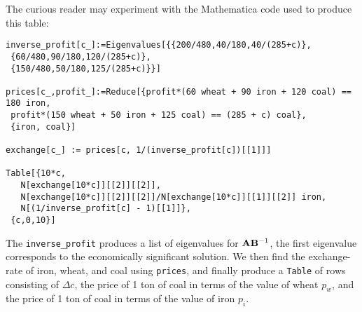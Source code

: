   The curious reader may experiment with the Mathematica code used to
  produce this table:
\begin{Verbatim}
inverse_profit[c_]:=Eigenvalues[{{200/480,40/180,40/(285+c)},
 {60/480,90/180,120/(285+c)},
 {150/480,50/180,125/(285+c)}}]

prices[c_,profit_]:=Reduce[{profit*(60 wheat + 90 iron + 120 coal) == 180 iron,
 profit*(150 wheat + 50 iron + 125 coal) == (285 + c) coal},
 {iron, coal}]

exchange[c_] := prices[c, 1/(inverse_profit[c])[[1]]]

Table[{10*c,
   N[exchange[10*c]][[2]][[2]],
   N[exchange[10*c]][[2]][[2]]/N[exchange[10*c]][[1]][[2]] iron,
   N[(1/inverse_profit[c] - 1)[[1]]},
 {c,0,10}]
\end{Verbatim}
The \verb#inverse_profit# produces a list of eigenvalues for
$\mathbf{A}\mathbf{B}^{-1}$, the first eigenvalue corresponds to the
economically significant solution. We then find the exchange-rate of
iron, wheat, and coal using \verb#prices#, and finally produce a
\verb#Table# of rows consisting of $\Delta c$, the price of 1 ton of
coal in terms of the value of wheat $p_{w}$, and the price of 1 ton of
coal in terms of the value of iron $p_{i}$.